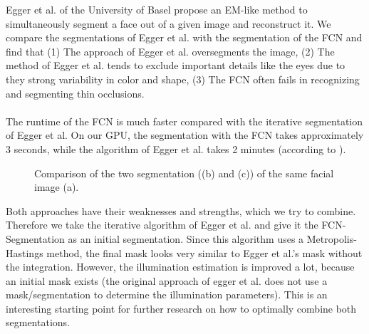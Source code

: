 Egger et al. \cite{egger_paper} of the University of Basel propose an EM-like method to simultaneously segment a face out of a given image and reconstruct it. We compare the segmentations of Egger et al. with the segmentation of the FCN and find that (1) The approach of Egger et al. oversegments the image, (2) The method of Egger et al. tends to exclude important details like the eyes due to they strong variability in color and shape, (3) The FCN often fails in recognizing and segmenting thin occlusions.\\
\\
The runtime of the FCN is much faster compared with the iterative segmentation of Egger et al. On our GPU, the segmentation with the FCN takes approximately 3 seconds, while the algorithm of Egger et al. takes 2 minutes (according to \cite{egger_paper}).

\begin{figure}
\centering
{}
\caption{Comparison of the two segmentation ((b) and (c)) of the same facial image (a).}
\label{fig:chap5:harry}
\end{figure}

Both approaches have their weaknesses and strengths, which we try to combine. Therefore we take the iterative algorithm of Egger et al. and give it the FCN-Segmentation as an initial segmentation. Since this algorithm uses a Metropolis-Hastings method, the final mask looks very similar to Egger et al.'s mask without the integration. However, the illumination estimation is improved a lot, because an initial mask exists (the original approach of egger et al. does not use a mask/segmentation to determine the illumination parameters). This is an interesting starting point for further research on how to optimally combine both segmentations.